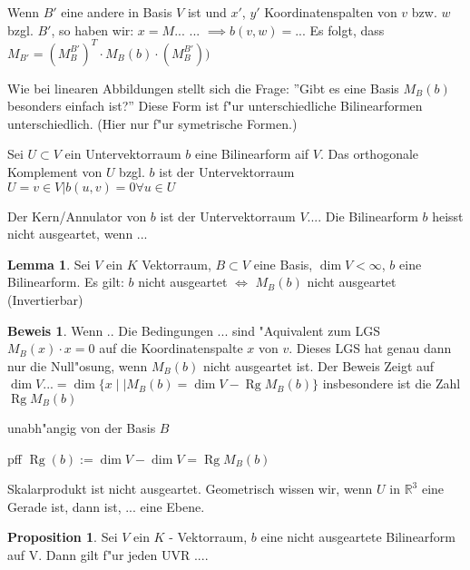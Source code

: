 \documentclass[oneside,fontsize=11pt,paper=a4,BCOR=0mm,DIV=12,automark,headsepline]{scrbook}
\DeclareMathOperator{\mRg}{Rg}
\theoremstyle{remark}
\theoremstyle{definition}
\newtheorem*{proposition}{Proposition}
\newtheorem{lemma}{Lemma}[section]
\theoremstyle{definition}
\newtheorem*{prof}{Beweis}
\theoremstyle{remark}
\begin{document}
Wenn $B'$ eine andere in Basis $V$ ist und $x'$, $y'$ Koordinatenspalten von $v$
bzw. $w$ bzgl. $B'$, so haben wir: $x=M...$ ...  $\implies b(v,w)= ...$ Es
folgt, dass $M_{B'}= (M^{B'}_{B})^T\cdot M_B(b)\cdot (M^{B'}_{B}))$

Wie bei linearen Abbildungen stellt sich die Frage: ''Gibt es eine Basis
$M_B(b)$ besonders einfach ist?'' Diese Form ist f"ur unterschiedliche
Bilinearformen unterschiedlich. (Hier nur f"ur symetrische Formen.)

\begin{definition}
  Sei $U\subset V$ ein Untervektorraum $b$ eine Bilinearform aif $V$. Das
  orthogonale Komplement von $U$ bzgl. $b$ ist der Untervektorraum $U={v\in
    V|b(u,v)=0 \forall u\in U}$

  Der Kern/Annulator von $b$ ist der Untervektorraum $V....$ Die Bilinearform
  $b$ heisst nicht ausgeartet, wenn ...
\end{definition}

\begin{lemma}
  Sei $V$ ein $K$ Vektorraum, $B\subset V$ eine Basis, $\dim V < \infty$, $b$
  eine Bilinearform. Es gilt: $b$ nicht ausgeartet $\iff$ $M_B(b)$ nicht
  ausgeartet (Invertierbar)
\end{lemma}

\begin{prof}
  Wenn ..
  Die Bedingungen ... sind "Aquivalent zum LGS $M_B(x) \cdot x = 0 $  auf die
  Koordinatenspalte $x$ von $v$. Dieses LGS hat genau dann nur die Null"osung,
  wenn $M_B(b)$ nicht ausgeartet ist. Der Beweis Zeigt auf $\dim V... = \dim
  \{x\mid|  M_B(b)= \dim V - \mRg M_B(b)\}$ insbesondere ist die Zahl $\mRg M_B(b)$

  unabh"angig von der Basis $B$
\end{prof}

\begin{definition}{pff}{}
  \(\mRg(b):=\dim V - \dim V = \mRg M_B(b)\)
\end{definition}

\begin{exa}
  Skalarprodukt ist nicht ausgeartet. Geometrisch wissen wir, wenn $U$ in
  $\mathbb{R}^3$ eine Gerade ist, dann ist, ... eine Ebene.
\end{exa}

\begin{proposition}
  Sei $V$ ein $K$ - Vektorraum, $b$ eine nicht ausgeartete Bilinearform auf V.
  Dann gilt f"ur jeden UVR ....
\end{proposition}
\end{document}
